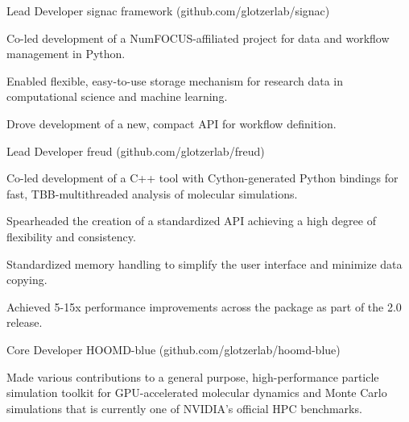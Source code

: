 \begin{cventries}
  \cventry
    {Lead Developer} %
    {signac framework ({\tiny github.com/glotzerlab/signac})} %
    {} %
    {} %
    {
      \begin{cvitems} %
        \item Co-led development of a NumFOCUS-affiliated project for data and workflow management in Python.
        \item Enabled flexible, easy-to-use storage mechanism for research data in computational science and machine learning.
        \item Drove development of a new, compact API for workflow definition.
      \end{cvitems}
    }
  \cventry
    {Lead Developer} %
    {freud ({\tiny github.com/glotzerlab/freud})} %
    {} %
    {} %
    {
      \begin{cvitems} %
        \item Co-led development of a C++ tool with Cython-generated Python bindings for fast, TBB-multithreaded analysis of molecular simulations.
        \item Spearheaded the creation of a standardized API achieving a high degree of flexibility and consistency.
        \item Standardized memory handling to simplify the user interface and minimize data copying.
        \item Achieved 5-15x performance improvements across the package as part of the 2.0 release.
      \end{cvitems}
    }
  \cventry
    {Core Developer} %
    {HOOMD-blue ({\tiny github.com/glotzerlab/hoomd-blue})} %
    {} %
    {} %
    {
      \begin{cvitems} %
        \item Made various contributions to a general purpose, high-performance particle simulation toolkit for GPU-accelerated molecular dynamics and Monte Carlo simulations that is currently one of NVIDIA's official HPC benchmarks.

\end{cvitems}}
\end{cventries}
